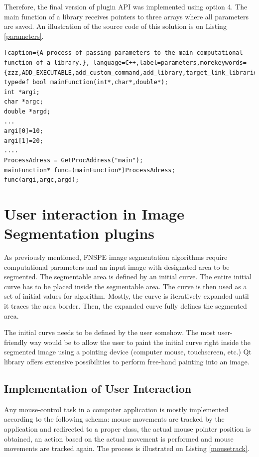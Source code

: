 Therefore, the final version of plugin API was implemented using option 4. The main function of a library receives pointers to three arrays where all parameters are saved. An illustration of the source code of this solution is on Listing \ref{parameters}.

\begin{lstlisting}[caption={A process of passing parameters to the main computational function of a library.}, language=C++,label=parameters,morekeywords={zzz,ADD_EXECUTABLE,add_custom_command,add_library,target_link_libraries,OUTPUT,COMMAND,xxx})]
typedef bool mainFunction(int*,char*,double*);
int *argi;
char *argc;
double *argd;
...
argi[0]=10;
argi[1]=20;
....
ProcessAdress = GetProcAddress("main");
mainFunction* func=(mainFunction*)ProcessAdress;
func(argi,argc,argd);
\end{lstlisting}

\section{User interaction in Image Segmentation plugins}
As previously mentioned, FNSPE image segmentation algorithms require computational parameters and an input image with designated area to be segmented. The segmentable area is defined by an initial curve. The entire initial curve has to be placed inside the segmentable area. The curve is then used as a set of initial values for algorithm. Mostly, the curve is iteratively expanded until it traces the area border. Then, the expanded curve fully defines the segmented area.

The initial curve needs to be defined by the user somehow. The most user-friendly way would be to allow the user to paint the initial curve right inside the segmented image using a pointing device (computer mouse, touchscreen, etc.) Qt library offers extensive possibilities to perform free-hand painting into an image.

\subsection{Implementation of User Interaction}

Any mouse-control task in a computer application is mostly implemented according to the following schema: mouse movements are tracked by the application and redirected to a proper class, the actual mouse pointer position is obtained, an action based on the actual movement is performed and mouse movements are tracked again. The process is illustrated on Listing \ref{mousetrack}.

